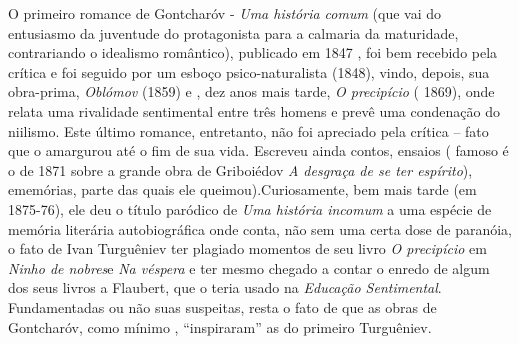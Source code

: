 O primeiro romance de Gontcharóv - \emph{Uma história comum} (que vai do
entusiasmo da juventude do protagonista para a calmaria da maturidade,
contrariando o idealismo romântico), publicado em 1847 , foi bem
recebido pela crítica e foi seguido por um esboço psico-naturalista
(1848), vindo, depois, sua obra-prima, \emph{Oblómov} (1859) e , dez
anos mais tarde, \emph{O precipício} ( 1869), onde relata uma rivalidade
sentimental entre três homens e prevê uma condenação do niilismo. Este
último romance, entretanto, não foi apreciado pela crítica -- fato que o
amargurou até o fim de sua vida. Escreveu ainda contos, ensaios ( famoso
é o de 1871 sobre a grande obra de Griboiédov \emph{A desgraça de se ter
espírito}), ememórias, parte das quais ele queimou).Curiosamente, bem
mais tarde (em 1875-76), ele deu o título paródico de \emph{Uma história
incomum} a uma espécie de memória literária autobiográfica onde conta,
não sem uma certa dose de paranóia, o fato de Ivan Turguêniev ter
plagiado momentos de seu livro \emph{O precipício} em \emph{Ninho de
nobres}e \emph{Na véspera} e ter mesmo chegado a contar o enredo de
algum dos seus livros a Flaubert, que o teria usado na \emph{Educação
Sentimental}. Fundamentadas ou não suas suspeitas, resta o fato de que
as obras de Gontcharóv, como mínimo , ``inspiraram'' as do primeiro
Turguêniev.

